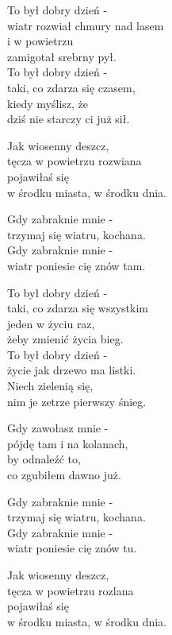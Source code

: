 \begin{text}
    To był dobry dzień -\\
    wiatr rozwiał chmury nad lasem\\
    i w powietrzu\\
    zamigotał srebrny pył.\\
    To był dobry dzień -\\
    taki, co zdarza się czasem,\\
    kiedy myślisz, że\\
    dziś nie starczy ci już sił.

    Jak wiosenny deszcz,\\
    tęcza w powietrzu rozwiana\\
    pojawiłaś się\\
    w środku miasta, w środku dnia.

    Gdy zabraknie mnie -\\
    trzymaj się wiatru, kochana.\\
    Gdy zabraknie mnie -\\
    wiatr poniesie cię znów tam.

    To był dobry dzień -\\
    taki, co zdarza się wszystkim\\
    jeden w życiu raz,\\
    żeby zmienić życia bieg.\\
    To był dobry dzień -\\
    życie jak drzewo ma listki.\\
    Niech zielenią się,\\
    nim je zetrze pierwszy śnieg.

    Gdy zawołasz mnie -\\
    pójdę tam i na kolanach,\\
    by odnaleźć to,\\
    co zgubiłem dawno już.

    Gdy zabraknie mnie -\\
    trzymaj się wiatru, kochana.\\
    Gdy zabraknie mnie -\\
    wiatr poniesie cię znów tu.

    Jak wiosenny deszcz,\\
    tęcza w powietrzu rozlana\\
    pojawiłaś się\\
    w środku miasta, w środku dnia.


\end{text}
